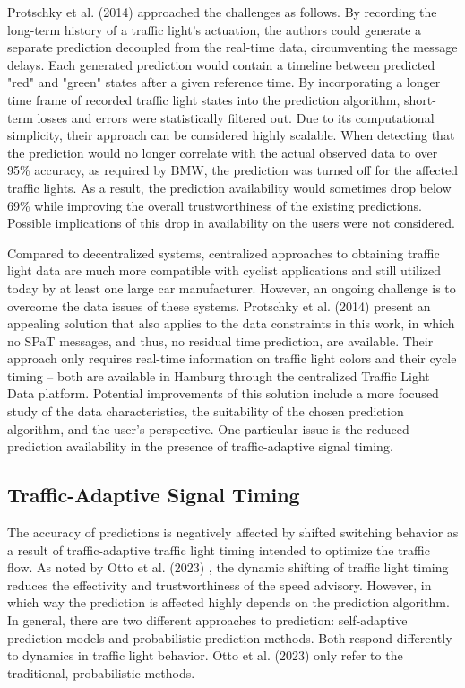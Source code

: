 Protschky et al. (2014) \cite{protschky_extensive_2014, protschky_adaptive_2014} approached the challenges as follows. By recording the long-term history of a traffic light's actuation, the authors could generate a separate prediction decoupled from the real-time data, circumventing the message delays. Each generated prediction would contain a timeline between predicted "red" and "green" states after a given reference time. By incorporating a longer time frame of recorded traffic light states into the prediction algorithm, short-term losses and errors were statistically filtered out. Due to its computational simplicity, their approach can be considered highly scalable. When detecting that the prediction would no longer correlate with the actual observed data to over 95\% accuracy, as required by BMW, the prediction was turned off for the affected traffic lights. As a result, the prediction availability would sometimes drop below 69\% while improving the overall trustworthiness of the existing predictions. Possible implications of this drop in availability on the users were not considered.

Compared to decentralized systems, centralized approaches to obtaining traffic light data are much more compatible with cyclist applications and still utilized today by at least one large car manufacturer. However, an ongoing challenge is to overcome the data issues of these systems. Protschky et al. (2014) \cite{protschky_extensive_2014, protschky_adaptive_2014} present an appealing solution that also applies to the data constraints in this work, in which no SPaT messages, and thus, no residual time prediction, are available. Their approach only requires real-time information on traffic light colors and their cycle timing -- both are available in Hamburg through the centralized Traffic Light Data platform. Potential improvements of this solution include a more focused study of the data characteristics, the suitability of the chosen prediction algorithm, and the user's perspective. One particular issue is the reduced prediction availability in the presence of traffic-adaptive signal timing.

\subsection{Traffic-Adaptive Signal Timing}

The accuracy of predictions is negatively affected by shifted switching behavior as a result of traffic-adaptive traffic light timing intended to optimize the traffic flow. As noted by Otto et al. (2023) \cite{otto_framework_2023}, the dynamic shifting of traffic light timing reduces the effectivity and trustworthiness of the speed advisory. However, in which way the prediction is affected highly depends on the prediction algorithm. In general, there are two different approaches to prediction: self-adaptive prediction models and probabilistic prediction methods. Both respond differently to dynamics in traffic light behavior. Otto et al. (2023) \cite{otto_framework_2023} only refer to the traditional, probabilistic methods.

